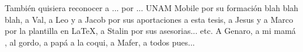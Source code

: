 
\begin{acknowledgements}

También quisiera reconocer a ... por ... UNAM Mobile por su formación blah blah blah, a Val, a Leo y a Jacob por sus aportaciones a esta tesis, a Jesus y a Marco por la plantilla en LaTeX, a Stalin por sus asesorias... etc. A Genaro, a mi mamá , al gordo, a papá a la coqui, a Mafer, a todos pues...
\blindtext %
\end{acknowledgements}




